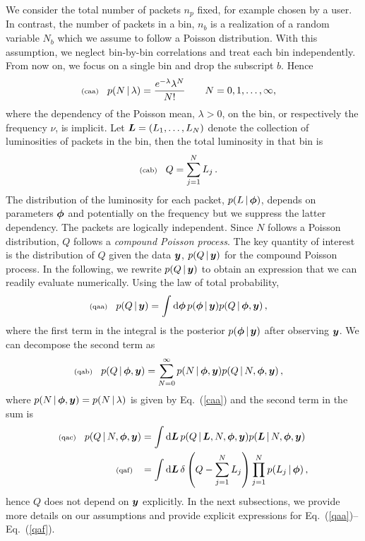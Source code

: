 \documentclass[11pt]{article}
\newcommand{\lleq}[1]{\label{#1} }
\renewcommand{\lleq}[1]{\label{#1} {\scriptstyle {\rm (#1)}} \hspace*{2ex} }
\newcommand{\cond}{\,|\,}
\newcommand{\refeq}[1]{Eq.~(\ref{#1})}
\newcommand{\npack}{{n_p}}
\newcommand{\Lumtot}{Q}
\newcommand{\lumtot}{q}
\newcommand{\Lum}{L}
\newcommand{\lum}{\ell}
\newcommand{\rmdx}[1]{\dd{#1}} %
\begin{document}
We consider the total number of packets $\npack$ fixed, for example
chosen by a user. In contrast, the number of packets in a bin, $n_b$
is a realization of a random variable $N_b$ which we assume to follow
a Poisson distribution. With this assumption, we neglect bin-by-bin
correlations and treat each bin independently. From now on, we focus
on a single bin and drop the subscript $b$. Hence
\begin{align}
  \lleq{caa}
  p(N\cond\lambda) &= \frac{e^{-\lambda}\lambda^N}{N!}
  \qquad N = 0,1,\ldots,\infty ,
\end{align}
where the dependency of the Poisson mean, $\lambda>0$, on the bin, or
respectively the frequency $\nu$, is implicit. Let $\bmL = (\Lum_1,\dotsc,\Lum_N)$ denote the
collection of luminosities of packets in the bin, then the total
luminosity in that bin is
\begin{align}
  \lleq{cab}
  \Lumtot &= \sum_{j=1}^{N} \Lum_j%
  \,.
\end{align}
The distribution of the luminosity for each packet,
$p(\Lum \cond \bmphi)$, depends on parameters ${\bm{\phi}}$ and potentially
on the frequency but we suppress the latter dependency.  The packets
are logically independent. Since $N$ follows a Poisson distribution,
$\Lumtot$ follows a \emph{compound Poisson process}.
%
The key quantity of interest is the distribution of $\Lumtot$ given
the data ${\bm{y}}$, $p(\Lumtot \cond \bmy)$ for the compound Poisson
process. In the following, we rewrite $p(\Lumtot \cond \bmy)$ to
obtain an expression that we can readily evaluate numerically. Using
the law of total probability,
\begin{align}
  \lleq{qaa}
  p(\Lumtot \cond \bmy) &= \int \rmdx{\bmphi} p(\bmphi \cond \bmy) p(\Lumtot \cond \bmphi, \bmy) \,,
\end{align}
where the first term in the integral is the posterior $p(\bmphi \cond \bmy)$ after observing ${\bm{y}}$. We can decompose the second term as
\begin{align}
  \lleq{qab}
  p(\Lumtot \cond \bmphi, \bmy) &= \sum_{N=0}^\infty  p(N \cond \bmphi, \bmy) p(\Lumtot \cond N, \bmphi, \bmy)\,,
\end{align}
where $p(N \cond \bmphi, \bmy) = p(N \cond \lambda)$ is given by
\refeq{caa} and the second term in the sum is
\begin{align}
  \lleq{qac}
  p(\Lumtot \cond N, \bmphi, \bmy) &= \int \rmdx{\bmL} p(\Lumtot \cond \bmL, N, \bmphi, \bmy) p(\bmL \cond N, \bmphi, \bmy)\\
  \lleq{qaf}
  &= \int \rmdx{\bmL} \delta \left( \Lumtot - \sum_{j=1}^N \Lum_j  \right) \prod_{j=1}^N p(\Lum_j \cond \bmphi)\,,
\end{align}
hence $Q$ does not depend on ${\bm{y}}$ explicitly. In the next
subsections, we provide more details on our assumptions and provide
explicit expressions for \refeq{qaa}--\refeq{qaf}.
\end{document}
